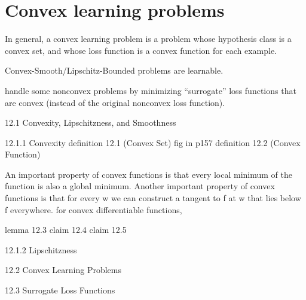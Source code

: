 \section{Convex learning problems}

In general, a convex learning problem is a problem whose hypothesis class is a
convex set, and whose loss function is a convex function for each example.

Convex-Smooth/Lipschitz-Bounded
problems are learnable.

handle some nonconvex problems
by minimizing “surrogate” loss functions that are convex (instead of the original
nonconvex loss function).

12.1 Convexity, Lipschitzness, and Smoothness

12.1.1 Convexity
definition 12.1 (Convex Set)
fig in p157
definition 12.2 (Convex Function)

An important property of convex functions is that every local minimum of the
function is also a global minimum.
Another important property of convex functions is that for every w we can
construct a tangent to f at w that lies below f everywhere.
 for convex differentiable functions,

lemma 12.3
claim 12.4
claim 12.5


12.1.2
Lipschitzness

12.2
 Convex Learning Problems

12.3
 Surrogate Loss Functions
